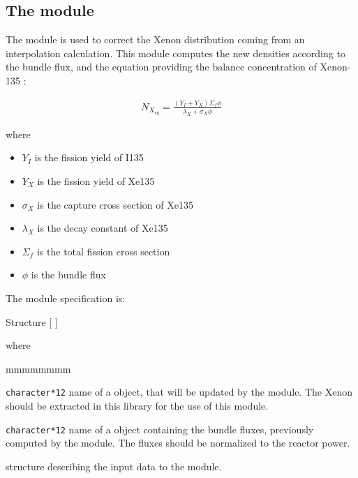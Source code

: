 \subsection{The  module}\label{sect:xenon}

\vskip 0.2cm
The  module is used to correct the Xenon distribution coming from an interpolation calculation.
 This module computes the new densities according to the bundle flux, and the equation providing the balance concentration of Xenon-135  :

\begin{eqnarray} \label{eqn:xe135eq}
N_{X_{eq}}=\frac{(Y_I+Y_X) \Sigma_f \phi}{\lambda_X + \sigma_X \phi}
\end{eqnarray}

\noindent where
\begin{itemize} 
\item $Y_I$ is the fission yield of I135
\item $Y_X$ is the fission yield of Xe135
\item $\sigma_X$ is the capture cross section of Xe135
\item $\lambda_X$ is the decay constant of Xe135
\item $\Sigma_f$ is the total fission cross section
\item $\phi$ is the bundle flux
\end{itemize}

\noindent
The  module specification is:

\begin{DataStructure}{Structure }
  \moc{:=}  
$[$  $]$  \\
\moc{::} 
\end{DataStructure}

\noindent where

\begin{ListeDeDescription}{mmmmmmmm}

\item[\dusa{MICROLIB}] \texttt{character*12} name of a  object,
that will be updated by the  module. The Xenon should be extracted in this library for the use of this module.

\item[\dusa{POWER}] \texttt{character*12} name of a  object
containing the bundle fluxes, previously computed by the
 module. The fluxes should be normalized to the reactor power.

\item[\dstr{descxenon}] structure describing the input data to the  module.

\end{ListeDeDescription}

